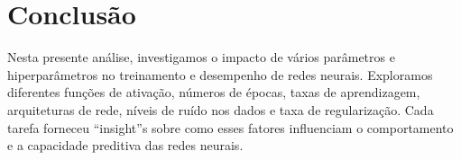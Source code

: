 \section{Conclusão}

Nesta presente análise, investigamos o impacto de vários parâmetros e 
hiperparâmetros no treinamento e desempenho de redes neurais. Exploramos 
diferentes funções de ativação, números de épocas, taxas de aprendizagem, 
arquiteturas de rede, níveis de ruído nos dados e taxa de regularização. 
Cada 
tarefa forneceu ``insight''s sobre como esses fatores influenciam o 
comportamento e a capacidade preditiva das redes neurais.

\begin{comment}
Na tarefa 1, descobrimos que a função de ativação Gelu nas camadas 
intermediárias resultou em uma melhor capacidade de aprendizado em 
comparação 
com a função sigmóide. A função Relu, embora interessante, apresentou um 
comportamento mais ruidoso, sugerindo a necessidade de uma inicialização 
de 
parâmetros e taxa de aprendizagem cuidadosas.

Na tarefa 2, observamos que um número excessivo de épocas de treinamento 
pode 
não trazer benefícios significativos após um certo ponto. As redes neurais 
convergiram para erros semelhantes após 5000 épocas, e a rede treinada com 
apenas 1000 épocas exibiu underfitting. Esta análise destaca a importância 
de 
monitorar o desempenho em diferentes pontos do treinamento.

A tarefa 3 enfatizou a escolha crucial da taxa de aprendizagem. Uma taxa 
muito 
baixa resultou em convergência lenta, enquanto uma taxa muito alta levou a 
um 
comportamento instável. A taxa de 0,05 pareceu ser um bom equilíbrio, 
proporcionando uma convergência suave e um bom desempenho final.

Na tarefa 4, descobrimos que a complexidade da arquitetura da rede deve 
ser 
considerada em relação à quantidade de dados. Uma rede neural mais simples 
pode 
convergir bem e fornecer resultados comparáveis a redes mais profundas, 
dependendo do problema.

A tarefa 5 revelou que níveis mais altos de ruído nos dados resultaram em 
uma 
convergência mais lenta e instável, mas o modelo adaptou-se e aprendeu a 
lidar 
com o ruído. Esta análise destaca a importância de considerar a qualidade 
dos 
dados e a necessidade de lidar com o ruído durante o treinamento.

Por fim, na tarefa 6, vimos que a regularização L2 pode ajudar a prevenir 
o 
overfitting, mas uma regularização muito forte pode levar a underfitting. 
O 
valor de λ=0.001 pareceu ser um bom equilíbrio, permitindo alguma 
regularização 
sem comprometer o desempenho.
\end{comment}

